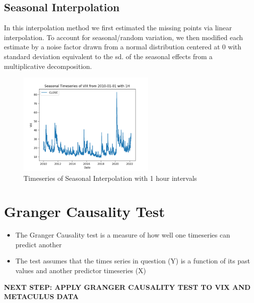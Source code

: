 \documentclass{article}
\begin{document}
\subsection{Seasonal Interpolation}
In this interpolation method we first estimated the missing points via linear interpolation. To account for seasonal/random variation, we then modified each estimate by a noise factor drawn from a normal distribution centered at 0 with standard deviation equivalent to the sd. of the seasonal effects from a multiplicative decomposition. 

\begin{figure}[h!]
    \centering
    \includegraphics[width= 0.6\textwidth]{VIX_seasonal_interpolation_2010_1H.png}
    \caption{Timeseries of Seasonal Interpolation with 1 hour intervals}
\end{figure}


\newpage
\section{Granger Causality Test}
\begin{itemize}
    \item The Granger Causality test is a measure of how well one timeseries can predict another
    \item The test assumes that the times series in question (Y) is a function of its past values and another predictor timeseries (X)
\end{itemize}

\textbf{NEXT STEP: APPLY GRANGER CAUSALITY TEST TO VIX AND METACULUS DATA}
\end{document}
